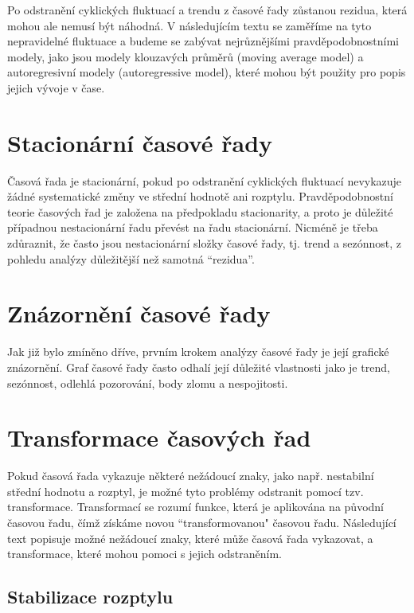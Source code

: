 Po odstranění cyklických fluktuací a trendu z časové řady zůstanou rezidua, která mohou ale nemusí být náhodná. V následujícím textu se zaměříme na tyto nepravidelné fluktuace a budeme se zabývat nejrůznějšími pravděpodobnostními modely, jako jsou modely klouzavých průměrů (moving average model) a autoregresivní modely (autoregressive model), které mohou být použity pro popis jejich vývoje v čase.

\section{Stacionární časové řady}

Časová řada je stacionární, pokud po odstranění cyklických fluktuací nevykazuje žádné systematické změny ve střední hodnotě ani rozptylu. Pravděpodobnostní teorie časových řad je založena na předpokladu stacionarity, a proto je důležité případnou nestacionární řadu převést na řadu stacionární. Nicméně je třeba zdůraznit, že často jsou nestacionární složky časové řady, tj. trend a sezónnost, z pohledu analýzy důležitější než samotná ``rezidua''.

\section{Znázornění časové řady}

Jak již bylo zmíněno dříve, prvním krokem analýzy časové řady je její grafické znázornění. Graf časové řady často odhalí její důležité vlastnosti jako je trend, sezónnost, odlehlá pozorování, body zlomu a nespojitosti.

\section{Transformace časových řad}

Pokud časová řada vykazuje některé nežádoucí znaky, jako např. nestabilní střední hodnotu a rozptyl, je možné tyto problémy odstranit pomocí tzv. transformace. Transformací se rozumí funkce, která je aplikována na původní časovou řadu, čímž získáme novou ``transformovanou" časovou řadu. Následující text popisuje možné nežádoucí znaky, které může časová řada vykazovat, a transformace, které mohou pomoci s jejich odstraněním.

\subsection{Stabilizace rozptylu}

